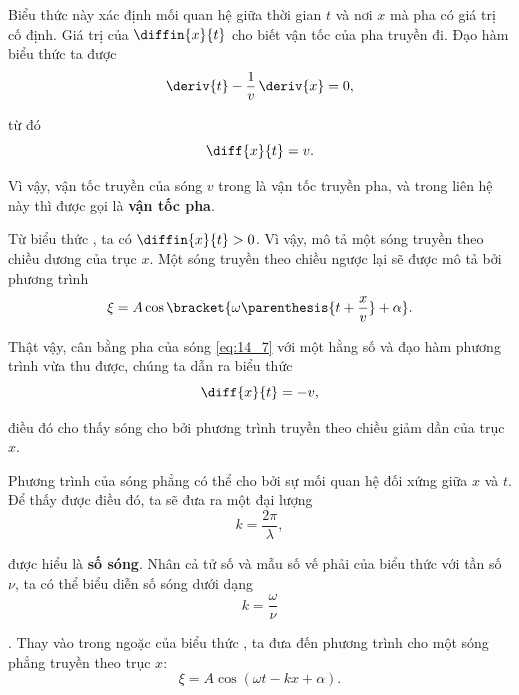 \noindent
Biểu thức này xác định mối quan hệ giữa thời gian $t$ và nơi $x$ mà pha có giá trị cố định. Giá trị của $\diffin{x}{t}$ cho biết vận tốc của pha truyền đi. Đạo hàm biểu thức  ta được
\begin{equation*}
    \deriv{t} - \frac{1}{v}\, \deriv{x} = 0,
\end{equation*}

\noindent
từ đó
\begin{equation}\label{eq:14_6}
    \diff{x}{t} = v.
\end{equation}

\noindent
Vì vậy, vận tốc truyền của sóng $v$ trong  là vận tốc truyền pha, và trong liên hệ này thì được gọi là \textbf{vận tốc pha}.

Từ biểu thức , ta có $\diffin{x}{t}>0$. Vì vậy,  mô tả một sóng truyền theo chiều dương của trục $x$. Một sóng truyền theo chiều ngược lại sẽ được mô tả bởi phương trình
\begin{equation}\label{eq:14_7}
    \xi = A \cos\bracket{ \omega \parenthesis{t + \frac{x}{v}} + \alpha}.
\end{equation}

\noindent
Thật vậy, cân bằng pha của sóng \eqref{eq:14_7} với một hằng số và đạo hàm phương trình vừa thu được, chúng ta dẫn ra biểu thức
\begin{equation*}
    \diff{x}{t} = -v,
\end{equation*}

\noindent
điều đó cho thấy sóng cho bởi phương trình  truyền theo chiều giảm dần của trục $x$.

Phương trình của sóng phẳng có thể cho bởi sự mối quan hệ đối xứng giữa $x$ và $t$. Để thấy được điều đó, ta sẽ đưa ra một đại lượng
\begin{equation}\label{eq:14_8}
    k = \frac{2\pi}{\lambda},
\end{equation}

\noindent
được hiểu là \textbf{số sóng}. Nhân cả tử số và mẫu số vế phải của biểu thức  với tần số $\nu$, ta có thể biểu diễn số sóng dưới dạng
\begin{equation}\label{eq:14_9}
    k = \frac{\omega}{\nu}
\end{equation}

. Thay  vào trong ngoặc của biểu thức , ta đưa đến phương trình cho một sóng phẳng truyền theo trục $x$:
\begin{equation}\label{eq:14_10}
    \xi = A \cos(\omega t - kx + \alpha).
\end{equation}

